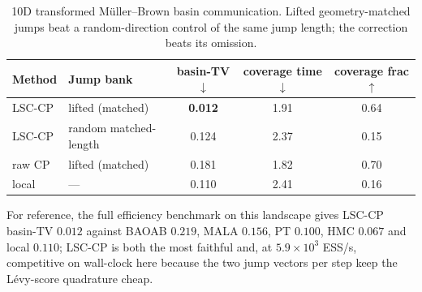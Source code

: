 \begin{table}[t]
\centering\small
\caption{10D transformed M\"uller--Brown basin communication. Lifted geometry-matched jumps beat a
random-direction control of the same jump length; the correction beats its omission.}
\label{tab:move2-geometry}
\begin{tabular}{llccc}
\toprule
Method & Jump bank & basin-TV $\downarrow$ & coverage time $\downarrow$ & coverage frac $\uparrow$ \\
\midrule
LSC-CP & lifted (matched) & \textbf{0.012} & 1.91 & 0.64 \\
LSC-CP & random matched-length & 0.124 & 2.37 & 0.15 \\
raw CP & lifted (matched) & 0.181 & 1.82 & 0.70 \\
local  & ---              & 0.110 & 2.41 & 0.16 \\
\bottomrule
\end{tabular}
\end{table}

For reference, the full efficiency benchmark on this landscape gives LSC-CP basin-TV $0.012$ against
BAOAB $0.219$, MALA $0.156$, PT $0.100$, HMC $0.067$ and local $0.110$; LSC-CP is both the most
faithful and, at $5.9\times10^3$ ESS/s, competitive on wall-clock here because the two jump vectors
per step keep the L\'evy-score quadrature cheap.
